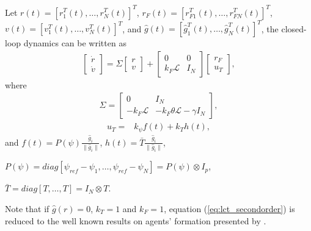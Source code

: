 Let  $r(t) = [ r_1^T(t) , \ldots, r_N^T(t) ]^T$,  
$r_F(t) = [ r_{F1}^T(t) ,\ldots, r_{FN}^T(t)]^T$, \\ 
$v(t) = [ v_1^T(t) ,\ldots, v_N^T(t) ]^T$, and
$\hat{g}(t) = \left[ \hat{g}^T_1(t),\ldots, \hat{g}^T_N(t) \right]^T$, 
the closed-loop dynamics can be written as
\begin{align}\label{eq:lct_secondorder}
\begin{bmatrix}
\dot{r}\\
\dot{v}
\end{bmatrix}
= 
\Sigma
\begin{bmatrix}
r\\
v
\end{bmatrix}
+
\begin{bmatrix}
0 & 0 \\
k_F\mathcal{L} & I_N  
\end{bmatrix}
\begin{bmatrix}
r_F \\
u_T
\end{bmatrix},
\end{align}
where
\begin{align*}
\Sigma=\begin{bmatrix}
0 & I_N \\
-k_F \mathcal{L}  &-k_F \theta \mathcal{L} - \gamma I_N
\end{bmatrix},
\end{align*}
\begin{align*}
u_{T}= & k_{\psi}f(t)+k_Th(t),
\end{align*}
and 
$f(t)=P(\psi)\frac{\hat{g}_i}{\|\hat{g}_i\|}$, 
$h(t)=\bar{T}\frac{\hat{g}_i}{\|\hat{g}_i\|}$, 

$P(\psi)= diag\left[\psi_{ref}-\psi_1, \ldots, \psi_{ref}-\psi_N \right]= P(\psi)\otimes I_p$, 

$\bar{T}= diag\left[T, \ldots, T\right]=I_N \otimes T$. 

Note that if $\hat{g}(r)=0$, $k_T =1$ and $k_F=1$, equation (\ref{eq:lct_secondorder}) is reduced to the well known results on agents' formation  presented by  \citep{RenAtkins07}.  



